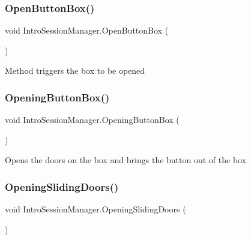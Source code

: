 \subsubsection{\texorpdfstring{Open\+Button\+Box()}{OpenButtonBox()}}
{\footnotesize\ttfamily void Intro\+Session\+Manager.\+Open\+Button\+Box (\begin{DoxyParamCaption}{ }\end{DoxyParamCaption})}



Method triggers the box to be opened 

\mbox{\label{class_intro_session_manager_ae9859df135187ffdfccd320d8d011500}} 
\subsubsection{\texorpdfstring{Opening\+Button\+Box()}{OpeningButtonBox()}}
{\footnotesize\ttfamily void Intro\+Session\+Manager.\+Opening\+Button\+Box (\begin{DoxyParamCaption}{ }\end{DoxyParamCaption})\hspace{0.3cm}{\ttfamily [private]}}



Opens the doors on the box and brings the button out of the box 

\mbox{\label{class_intro_session_manager_a6731f9f957d00bf47bb55f745f3af95b}} 
\subsubsection{\texorpdfstring{Opening\+Sliding\+Doors()}{OpeningSlidingDoors()}}
{\footnotesize\ttfamily void Intro\+Session\+Manager.\+Opening\+Sliding\+Doors (\begin{DoxyParamCaption}{ }\end{DoxyParamCaption})\hspace{0.3cm}{\ttfamily [private]}}



